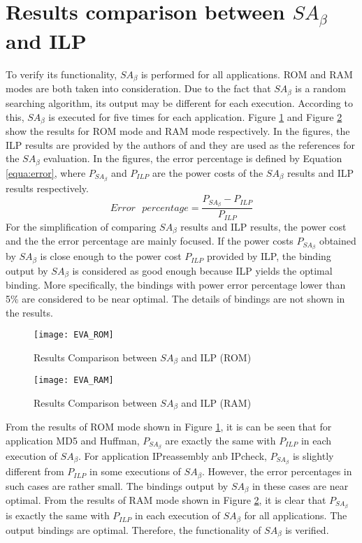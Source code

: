 	\section{Results comparison between $SA_{\beta}$ and ILP}
	\label{sec:evalution_p_1}
	To verify its functionality, $SA_{\beta}$ is performed for all applications.
	ROM and RAM modes are both taken into consideration. Due to the fact that
	$SA_\beta$ is a random searching algorithm, its output may be different
	for each execution. According to this, $SA_{\beta}$ is executed for five times
	for each application. Figure \ref{fig:EVA_ROM} and Figure \ref{fig:EVA_RAM}
	show the results for ROM mode and RAM mode respectively. In the figures, the
	ILP results are provided by the authors of \cite{Strobel2016} and they are
	used as the references for the $SA_{\beta}$ evaluation.
	In the figures, the error percentage is defined by Equation \ref{equa:error},
	where $P_{SA_{\beta}}$ and $P_{ILP}$ are the power costs of the $SA_{\beta}$
	results and ILP results respectively.
	\begin{equation}
	\label{equa:error}
	Error \text{ } percentage = \dfrac{P_{SA_{\beta}}-P_{ILP}}{P_{ILP}}
	\end{equation}
	For the simplification of comparing $SA_{\beta}$ results and ILP results,
	the power cost and the the error percentage are mainly focused.
	If the power costs $P_{SA_{\beta}}$
	obtained by $SA_{\beta}$ is close enough to the power cost $P_{ILP}$
	provided by ILP, the binding output by $SA_{\beta}$ is considered as
	good enough because ILP yields the optimal binding.
	More specifically, the bindings with power error percentage lower
	than 5\% are considered to be near optimal.
	The details of bindings are not shown in the results.
	\begin{figure}[htb]
		\begin{center}
			\texttt{[image: EVA\_ROM]}
			\caption{Results Comparison between $SA_{\beta}$ and ILP (ROM)}
			\label{fig:EVA_ROM}
		\end{center}
	\end{figure}
	\begin{figure}[htb]
		\begin{center}
			\texttt{[image: EVA\_RAM]}
			\caption{Results Comparison between $SA_{\beta}$ and ILP (RAM)}
			\label{fig:EVA_RAM}
		\end{center}
	\end{figure}

	From the results of ROM mode shown in Figure \ref{fig:EVA_ROM},
	it is can be seen that for application
	MD5 and Huffman, $P_{SA_{\beta}}$ are exactly the same with $P_{ILP}$
	in each execution of $SA_{\beta}$.
	For application IPreassembly anb IPcheck, $P_{SA_{\beta}}$
	is slightly different from $P_{ILP}$ in some executions of $SA_{\beta}$.
	However, the error percentages in such cases are rather small.
	The bindings output by $SA_{\beta}$ in these cases are near optimal.
	From the results of RAM mode shown in Figure \ref{fig:EVA_RAM},
	it is clear that $P_{SA_{\beta}}$ is exactly the same with $P_{ILP}$
	in each execution of $SA_{\beta}$ for all applications. The output
	bindings are optimal. Therefore, the functionality of $SA_{\beta}$
	is verified.
	
